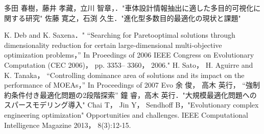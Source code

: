 \documentclass[11pt,a4j,notitlepage]{jsarticle}
\begin{document}
\vspace{-1.0zh}
\begin{thebibliography}{99}
  {\fontsize{10pt}{10pt}\selectfont
{}多田 春樹，藤井 孝藏，立川 智章，．"車体設計情報抽出に適した多目的可視化に関する研究"
佐藤 寛之，石渕 久生．"進化型多数目的最適化の現状と課題"

K. Deb and K. Saxena．" “Searching for Paretooptimal solutions through dimensionality reduction for
certain large-dimensional multi-objective optimization
problems，” In Proeedings of 2006 IEEE Congress on
Evolutionary Computation (CEC 2006)， pp. 3353–
3360， 2006."
H. Sato， H. Aguirre and K. Tanaka， “Controlling
dominance area of solutions and its impact on the performance of MOEAs，” In Proceedings of 2007 Evo
余 俊， 高木 英行，
“強制約条件付き最適化問題の2段階探索”
鐘 睿，高木 英行．"大規模最適化問題へのスパースモデリング導入"
Chai T， Jin Y， Sendhoff B，"Evolutionary complex
engineering optimization" Opportunities and challenges. IEEE Computational Intelligence Magazine
2013， 8(3):12-15.
}
\end{thebibliography}
\end{document}
